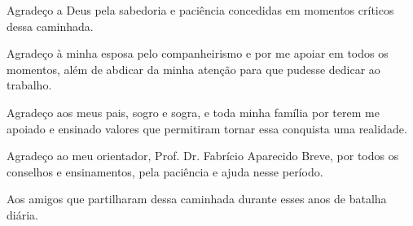 \begin{agradecimentos}

Agradeço a Deus pela sabedoria e paciência concedidas em momentos críticos dessa caminhada.

Agradeço à minha esposa pelo companheirismo e por me apoiar em todos os momentos, além de abdicar da minha atenção para que pudesse dedicar ao trabalho.

Agradeço aos meus pais, sogro e sogra, e toda minha família por terem me apoiado e ensinado valores que permitiram tornar essa conquista uma realidade.

Agradeço ao meu orientador, Prof. Dr. Fabrício Aparecido Breve, por todos os conselhos e ensinamentos, pela paciência e ajuda nesse período.

Aos amigos que partilharam dessa caminhada durante esses anos de batalha diária.


\end{agradecimentos}
